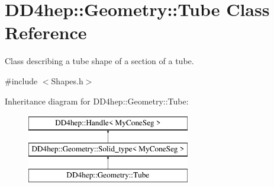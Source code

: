 \hypertarget{class_d_d4hep_1_1_geometry_1_1_tube}{}\section{D\+D4hep\+:\+:Geometry\+:\+:Tube Class Reference}
\label{class_d_d4hep_1_1_geometry_1_1_tube}


Class describing a tube shape of a section of a tube.  




{\ttfamily \#include $<$Shapes.\+h$>$}

Inheritance diagram for D\+D4hep\+:\+:Geometry\+:\+:Tube\+:\begin{figure}[H]
\begin{center}
\leavevmode
\includegraphics[height=3.000000cm]{class_d_d4hep_1_1_geometry_1_1_tube}
\end{center}
\end{figure}
